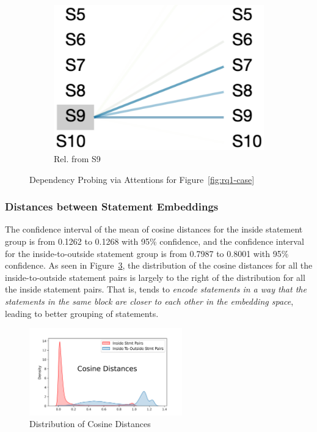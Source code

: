 \begin{figure}
\begin{subfigure}[b]{0.15\textwidth}
         \includegraphics[width=\textwidth]{sec9-fig3.png}
         \caption{Rel. from S9}
         \label{fig:stmt-9}
     \end{subfigure}
     \vspace{-9pt}
        \caption{Dependency Probing via Attentions for Figure~\ref{fig:rq1-case}}
        \label{fig:rq4-attention}
\end{figure}


\subsubsection{Distances between Statement Embeddings}
The confidence interval of the mean of cosine distances for the inside
statement group is from 0.1262 to 0.1268 with 95\% confidence, and the
confidence interval for the inside-to-outside statement group is
from 0.7987 to 0.8001 with 95\% confidence. As seen in
Figure~\ref{fig:rq4-density}, the distribution of the cosine distances
for all the inside-to-outside statement pairs is largely to the right
of the distribution for all the inside statement pairs. That is,
{\tool} tends to {\em encode statements in a way that the statements
  in the same  block are closer to each other in the
  embedding space}, leading to better grouping of statements.
  
\begin{figure}[t]
 	\centering
 	\includegraphics[width=2.6in]{rq4-density-v2.png}
        \vspace{-12pt}
 	\caption{Distribution of Cosine Distances}
 	\label{fig:rq4-density}	
\end{figure}




